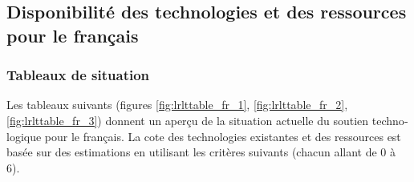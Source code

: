 \begin{french}
\begin{multicols}{2}
\subsection{Disponibilité des technologies et des ressources pour le français}



\subsubsection{Tableaux de situation}
Les tableaux suivants (figures \ref{fig:lrlttable_fr_1},
\ref{fig:lrlttable_fr_2}, \ref{fig:lrlttable_fr_3}) donnent un aperçu
de la situation actuelle du soutien technologique pour le français. La
cote des technologies existantes et des ressources est basée sur des
estimations en utilisant les critères suivants (chacun allant de 0 à
6).


\end{multicols}
\end{french}
